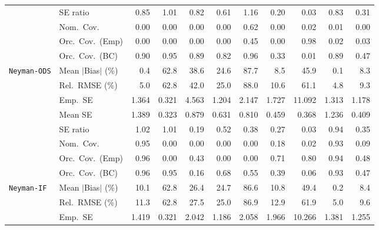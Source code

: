 \begin{landscape}
\begin{longtable}{llrrrrrrrrr}
 & SE ratio & \cellcolor{ranktwo}0.85 & \cellcolor{rankone}1.01 & 0.82 & 0.61 & \cellcolor{rankthree}1.16 & 0.20 & 0.03 & 0.83 & 0.31 \\
 & Nom.\ Cov. & 0.00 & 0.00 & 0.00 & 0.00 & \cellcolor{rankone}0.62 & 0.00 & \cellcolor{ranktwo}0.02 & \cellcolor{rankthree}0.01 & 0.00 \\
 & Orc.\ Cov.\ (Emp) & 0.00 & 0.00 & 0.00 & 0.00 & \cellcolor{ranktwo}0.45 & 0.00 & \cellcolor{rankone}0.98 & 0.02 & \cellcolor{rankthree}0.03 \\
 & Orc.\ Cov.\ (BC) & \cellcolor{rankthree}0.90 & \cellcolor{rankone}0.95 & 0.89 & 0.82 & \cellcolor{ranktwo}0.96 & 0.33 & 0.01 & 0.89 & 0.47 \\
\addlinespace[2pt]
\quad \texttt{Neyman-ODS} & Mean $|$Bias$|$ (\%) & \cellcolor{ranktwo}0.4 & 62.8 & 38.6 & 24.6 & 87.7 & 8.5 & 45.9 & \cellcolor{rankone}0.1 & \cellcolor{rankthree}8.3 \\
 & Rel.\ RMSE (\%) & \cellcolor{ranktwo}5.0 & 62.8 & 42.0 & 25.0 & 88.0 & 10.6 & 61.1 & \cellcolor{rankone}4.8 & \cellcolor{rankthree}9.3 \\
 & Emp.\ SE & 1.364 & 0.321 & 4.563 & 1.204 & 2.147 & 1.727 & 11.092 & 1.313 & 1.178 \\
 & Mean SE & 1.389 & 0.323 & 0.879 & 0.631 & 0.810 & 0.459 & 0.368 & 1.236 & 0.409 \\
 & SE ratio & \cellcolor{ranktwo}1.02 & \cellcolor{rankone}1.01 & 0.19 & 0.52 & 0.38 & 0.27 & 0.03 & \cellcolor{rankthree}0.94 & 0.35 \\
 & Nom.\ Cov. & \cellcolor{rankone}0.95 & 0.00 & 0.00 & 0.00 & 0.00 & \cellcolor{rankthree}0.18 & 0.02 & \cellcolor{ranktwo}0.93 & 0.09 \\
 & Orc.\ Cov.\ (Emp) & \cellcolor{rankone}0.96 & 0.00 & 0.43 & 0.00 & 0.00 & \cellcolor{rankthree}0.71 & \cellcolor{ranktwo}0.80 & \cellcolor{rankone}0.94 & 0.48 \\
 & Orc.\ Cov.\ (BC) & \cellcolor{ranktwo}0.96 & \cellcolor{rankone}0.95 & 0.16 & 0.68 & 0.55 & 0.39 & 0.06 & \cellcolor{rankthree}0.93 & 0.47 \\
\addlinespace[2pt]
\quad \texttt{Neyman-IF} & Mean $|$Bias$|$ (\%) & \cellcolor{rankthree}10.1 & 62.8 & 26.4 & 24.7 & 86.6 & 10.8 & 49.4 & \cellcolor{rankone}0.2 & \cellcolor{ranktwo}8.4 \\
 & Rel.\ RMSE (\%) & \cellcolor{rankthree}11.3 & 62.8 & 27.5 & 25.0 & 86.9 & 12.9 & 61.9 & \cellcolor{rankone}5.0 & \cellcolor{ranktwo}9.6 \\
 & Emp.\ SE & 1.419 & 0.321 & 2.042 & 1.186 & 2.058 & 1.966 & 10.266 & 1.381 & 1.255 \\

\end{longtable}
\end{landscape}
